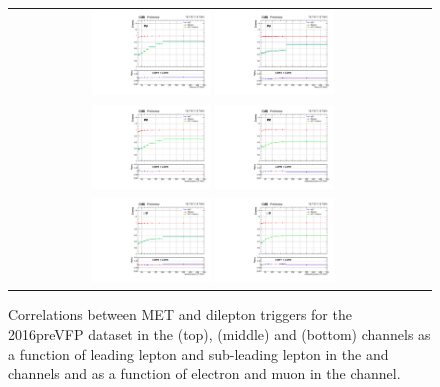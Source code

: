 \begin{figure}[!htb]
  \begin{center}
    \begin{tabular}{cc}
      \includegraphics[width=0.30\textwidth]{fig_2016preVFP_TrigSF/g_lepApt_emu_alpha.pdf}
      \includegraphics[width=0.30\textwidth]{fig_2016preVFP_TrigSF/g_lepBpt_emu_alpha.pdf}\\
      \includegraphics[width=0.30\textwidth]{fig_2016preVFP_TrigSF/g_lepApt_ee_alpha.pdf}
      \includegraphics[width=0.30\textwidth]{fig_2016preVFP_TrigSF/g_lepBpt_ee_alpha.pdf}\\
      \includegraphics[width=0.30\textwidth]{fig_2016preVFP_TrigSF/g_lepApt_mumu_alpha.pdf}
      \includegraphics[width=0.30\textwidth]{fig_2016preVFP_TrigSF/g_lepBpt_mumu_alpha.pdf}\\
    \end{tabular}
    \caption{Correlations between MET and dilepton triggers for the 2016preVFP dataset in the \emu (top), \ee (middle) and \mumu (bottom) channels as a function of leading lepton \pT and sub-leading lepton \pT in the \ee and \mumu channels and as a function of electron \pT and muon \pT in the \emu channel.}
    \label{TrigSF_2016preVFP_5}
  \end{center}
\end{figure}


